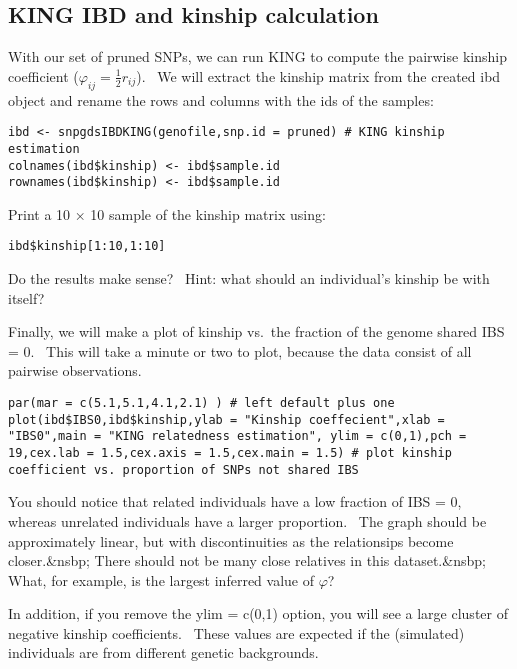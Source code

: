 \documentclass[
]{book}
\begin{document}
\hypertarget{king-ibd-and-kinship-calculation}{%
\subsection{KING IBD and kinship calculation}\label{king-ibd-and-kinship-calculation}}

With our set of pruned SNPs, we can run KING to compute the pairwise kinship coefficient (\(\varphi_{ij}=\frac{1}{2}r_{ij}\)).~ We will extract the kinship matrix from the created ibd object and rename the rows and columns with the ids of the samples:

\begin{verbatim}
ibd <- snpgdsIBDKING(genofile,snp.id = pruned) # KING kinship estimation
colnames(ibd$kinship) <- ibd$sample.id
rownames(ibd$kinship) <- ibd$sample.id
\end{verbatim}

Print a 10 × 10 sample of the kinship matrix using:

\begin{verbatim}
ibd$kinship[1:10,1:10]
\end{verbatim}

Do the results make sense?~ Hint: what should an individual's kinship be with itself?

Finally, we will make a plot of kinship vs.~the fraction of the genome shared IBS = 0.~ This will take a minute or two to plot, because the data consist of all pairwise observations.

\begin{verbatim}
par(mar = c(5.1,5.1,4.1,2.1) ) # left default plus one
plot(ibd$IBS0,ibd$kinship,ylab = "Kinship coeffecient",xlab = "IBS0",main = "KING relatedness estimation", ylim = c(0,1),pch = 19,cex.lab = 1.5,cex.axis = 1.5,cex.main = 1.5) # plot kinship coefficient vs. proportion of SNPs not shared IBS
\end{verbatim}

You should notice that related individuals have a low fraction of IBS = 0, whereas unrelated individuals have a larger proportion.~ The graph should be approximately linear, but with discontinuities as the relationsips become closer.\&nsbp; There should not be many close relatives in this dataset.\&nsbp; What, for example, is the largest inferred value of \(\varphi\)?

In addition, if you remove the ylim = c(0,1) option, you will see a large cluster of negative kinship coefficients.~ These values are expected if the (simulated) individuals are from different genetic backgrounds.
\end{document}
